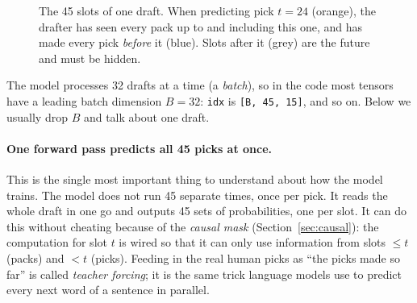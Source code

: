 \documentclass[11pt,letterpaper]{article}
\newcommand{\code}[1]{\texttt{\small #1}}
\newcommand{\shape}[1]{\texttt{\footnotesize[#1]}}
\begin{document}
\begin{figure}[!htbp]
\centering
{}
\caption{The 45 slots of one draft. When predicting pick $t=24$ (orange), the drafter has seen every pack
up to and including this one, and has made every pick \emph{before} it (blue). Slots after it (grey) are
the future and must be hidden.}
\label{fig:grid}
\end{figure}

The model processes 32 drafts at a time (a \emph{batch}), so in the code most tensors have a leading
batch dimension $B=32$: \code{idx} is \shape{B, 45, 15}, and so on. Below we usually drop $B$ and talk
about one draft.

\paragraph{One forward pass predicts all 45 picks at once.} This is the single most important thing to
understand about how the model trains. The model does not run 45 separate times, once per pick. It reads
the whole draft in one go and outputs 45 sets of probabilities, one per slot. It can do this without
cheating because of the \emph{causal mask} (Section~\ref{sec:causal}): the computation for slot $t$ is
wired so that it can only use information from slots $\le t$ (packs) and $<t$ (picks). Feeding in the
real human picks as ``the picks made so far'' is called \emph{teacher forcing}; it is the same trick
language models use to predict every next word of a sentence in parallel.
\end{document}
